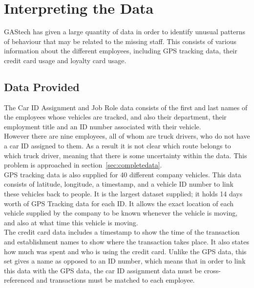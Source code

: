 \section{Interpreting the Data}
\label{sec:datainterpret}


GAStech has given a large quantity of data  in order to identify unusual patterns of behaviour that may be related to the missing staff. This consists of various information about the different employees, including GPS tracking data, their credit card usage and loyalty card usage.

\subsection{Data Provided}
\label{sec:dataprovided}

The Car ID Assignment and Job Role data consists of the first and last names of the employees whose vehicles are tracked, and also their department, their employment title and an ID number associated with their vehicle. \\

\noindent However there are nine employees, all of whom are truck drivers, who do not have a car ID assigned to them. As a result it is not clear which route belongs to which truck driver, meaning that there is some uncertainty within the data. This problem is approached in section~\ref{sec:completedata}. \\

\noindent GPS tracking data is also supplied for 40 different company vehicles.  This data consists of latitude, longitude, a timestamp, and a vehicle ID number to link these vehicles back to people. It is the largest dataset supplied; it holds 14 days worth of GPS Tracking data for each ID. It allows the exact location of each vehicle supplied by the company to be known whenever the vehicle is moving, and also at what time this vehicle is moving. \\

\noindent The credit card data includes a timestamp to show the time of the transaction and establishment names to show where the transaction takes place. It also states how much was spent and who is using the credit card. Unlike the GPS data, this set gives a name as opposed to an ID number, which means that in order to link this data with the GPS data, the car ID assignment data must be cross-referenced and transactions must be matched to each employee. \\

